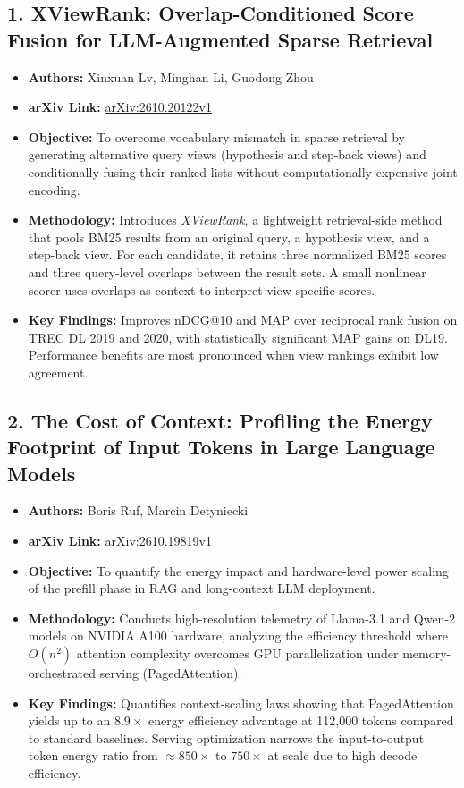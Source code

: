 \documentclass[11pt,a4paper]{article}
\begin{document}
\subsection{1. XViewRank: Overlap-Conditioned Score Fusion for LLM-Augmented Sparse Retrieval}
\begin{itemize}
    \item \textbf{Authors:} Xinxuan Lv, Minghan Li, Guodong Zhou \cite{lv2026xviewrank}
    \item \textbf{arXiv Link:} \href{http://arxiv.org/abs/2610.20122v1}{arXiv:2610.20122v1}
    \item \textbf{Objective:} To overcome vocabulary mismatch in sparse retrieval by generating alternative query views (hypothesis and step-back views) and conditionally fusing their ranked lists without computationally expensive joint encoding.
    \item \textbf{Methodology:} Introduces \textit{XViewRank}, a lightweight retrieval-side method that pools BM25 results from an original query, a hypothesis view, and a step-back view. For each candidate, it retains three normalized BM25 scores and three query-level overlaps between the result sets. A small nonlinear scorer uses overlaps as context to interpret view-specific scores.
    \item \textbf{Key Findings:} Improves nDCG@10 and MAP over reciprocal rank fusion on TREC DL 2019 and 2020, with statistically significant MAP gains on DL19. Performance benefits are most pronounced when view rankings exhibit low agreement.
\end{itemize}

\subsection{2. The Cost of Context: Profiling the Energy Footprint of Input Tokens in Large Language Models}
\begin{itemize}
    \item \textbf{Authors:} Boris Ruf, Marcin Detyniecki \cite{ruf2026cost}
    \item \textbf{arXiv Link:} \href{http://arxiv.org/abs/2610.19819v1}{arXiv:2610.19819v1}
    \item \textbf{Objective:} To quantify the energy impact and hardware-level power scaling of the prefill phase in RAG and long-context LLM deployment.
    \item \textbf{Methodology:} Conducts high-resolution telemetry of Llama-3.1 and Qwen-2 models on NVIDIA A100 hardware, analyzing the efficiency threshold where $O(n^2)$ attention complexity overcomes GPU parallelization under memory-orchestrated serving (PagedAttention).
    \item \textbf{Key Findings:} Quantifies context-scaling laws showing that PagedAttention yields up to an $8.9\times$ energy efficiency advantage at 112,000 tokens compared to standard baselines. Serving optimization narrows the input-to-output token energy ratio from $\approx 850\times$ to $750\times$ at scale due to high decode efficiency.
\end{itemize}
\end{document}
